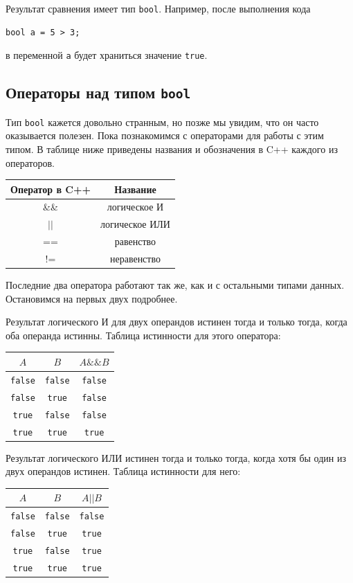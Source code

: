 \documentclass{article}
\newcommand{\tabularII}[1]{\begin{center}\begin{tabular}{|c|c|} #1 \end{tabular}\end{center}}
\newcommand{\tabularIII}[1]{\begin{center}\begin{tabular}{|c|c|c|} #1 \end{tabular}\end{center}}
\begin{document}
	Результат сравнения имеет тип \texttt{bool}. Например, после выполнения кода
	
	\begin{lstlisting}
bool a = 5 > 3;
	\end{lstlisting}
	
	в переменной \texttt{a} будет храниться значение \texttt{true}.
	
	\subsection{Операторы над типом \texttt{bool}}
	
	Тип \texttt{bool} кажется довольно странным, но позже мы увидим, что он часто оказывается полезен. Пока познакомимся с операторами для работы с этим типом. В таблице ниже приведены названия и обозначения в C++ каждого из операторов.
	
	\tabularII{
		\hline
		\textbf{Оператор в C++} & \textbf{Название}\\
		\hline
		\&\& & логическое И\\
		\hline
		$\vert\vert$ & логическое ИЛИ\\
		\hline
		== & равенство\\
		\hline
		!= & неравенство\\
		\hline
	}
	
	Последние два оператора работают так же, как и с остальными типами данных. Остановимся на первых двух подробнее.
	
	Результат логического И для двух операндов истинен тогда и только тогда, когда оба операнда истинны. Таблица истинности для этого оператора:
	
	\tabularIII{
		\hline
		\textbf{$A$} & \textbf{$B$} & \textbf{$A\&\&B$}\\
		\hline
		\texttt{false} & \texttt{false} & \texttt{false}\\
		\hline
		\texttt{false} & \texttt{true} & \texttt{false}\\
		\hline
		\texttt{true} & \texttt{false} & \texttt{false}\\
		\hline
		\texttt{true} & \texttt{true} & \texttt{true}\\
		\hline
	}
	
	Результат логического ИЛИ истинен тогда и только тогда, когда хотя бы один из двух операндов истинен. Таблица истинности для него:
	
	\tabularIII{
		\hline
		\textbf{$A$} & \textbf{$B$} & \textbf{$A\vert\vert B$}\\
		\hline
		\texttt{false} & \texttt{false} & \texttt{false}\\
		\hline
		\texttt{false} & \texttt{true} & \texttt{true}\\
		\hline
		\texttt{true} & \texttt{false} & \texttt{true}\\
		\hline
		\texttt{true} & \texttt{true} & \texttt{true}\\
		\hline
	}
	
\end{document}
